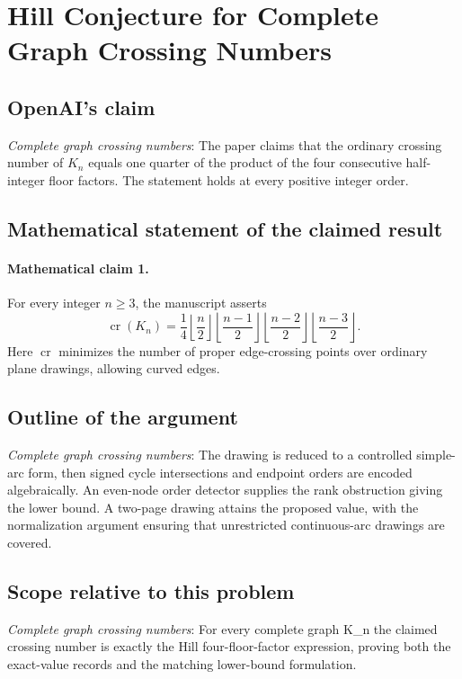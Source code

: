 \documentclass[11pt]{article}
\begin{document}
\section*{Hill Conjecture for Complete Graph Crossing Numbers}

\subsection{OpenAI's claim}
\textit{Complete graph crossing numbers}: The paper claims that the ordinary crossing number of $K_n$ equals one quarter of the product of the four consecutive half-integer floor factors. The statement holds at every positive integer order.

\subsection{Mathematical statement of the claimed result}
\paragraph{Mathematical claim 1.} For every integer $n\ge3$, the manuscript asserts \[\operatorname{cr}(K_n)=\frac14\left\lfloor\frac n2\right\rfloor\left\lfloor\frac{n-1}2\right\rfloor\left\lfloor\frac{n-2}2\right\rfloor\left\lfloor\frac{n-3}2\right\rfloor.\] Here $\operatorname{cr}$ minimizes the number of proper edge-crossing points over ordinary plane drawings, allowing curved edges.

\subsection{Outline of the argument}
\textit{Complete graph crossing numbers}: The drawing is reduced to a controlled simple-arc form, then signed cycle intersections and endpoint orders are encoded algebraically. An even-node order detector supplies the rank obstruction giving the lower bound. A two-page drawing attains the proposed value, with the normalization argument ensuring that unrestricted continuous-arc drawings are covered.

\subsection{Scope relative to this problem}
\textit{Complete graph crossing numbers}: For every complete graph K\_n the claimed crossing number is exactly the Hill four-floor-factor expression, proving both the exact-value records and the matching lower-bound formulation.
\end{document}
